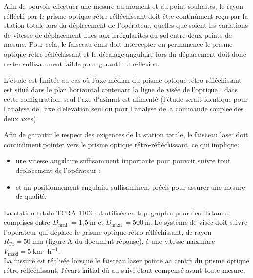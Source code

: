 Afin de pouvoir effectuer une mesure au moment et au point souhaités, le rayon réfléchi par le prisme optique rétro-réfléchissant doit être continûment reçu par la station totale lors du déplacement de l'opérateur, quelles que soient les variations de vitesse de déplacement dues aux irrégularités du sol entre deux points de mesure. Pour cela, le faisceau émis doit intercepter en permanence le prisme optique rétro-réfléchissant et le décalage angulaire lors du déplacement doit donc rester suffisamment faible pour garantir la réflexion.

L'étude est limitée au cas où l'axe médian du prisme optique rétro-réfléchissant est situé dans le plan horizontal contenant la ligne de visée de l'optique : dans cette configuration, seul l'axe d'azimut est alimenté (l'étude serait identique pour l'analyse de l'axe d'élévation seul ou pour l'analyse de la commande couplée des deux axes).

Afin de garantir le respect des exigences de la station totale, le faisceau laser doit continûment pointer vers le prisme optique rétro-réfléchissant, ce qui implique:

\begin{itemize}
  \item une vitesse angulaire suffisamment importante pour pouvoir suivre tout déplacement de l'opérateur ;
  \item et un positionnement angulaire suffisamment précis pour assurer une mesure de qualité.
\end{itemize}

La station totale TCRA 1103 est utilisée en topographie pour des distances comprises entre $D_{\text {mini }}=1,5 \mathrm{~m}$ et $D_{\text {maxi }}=500 \mathrm{~m}$. Le système de visée doit suivre l'opérateur qui déplace le prisme optique rétro-réfléchissant, de rayon $R_{\mathrm{Pr}}=50 \mathrm{~mm}$ (figure A du document réponse), à une vitesse maximale $V_{\mathrm{maxi}}=5 \mathrm{~km} \cdot \mathrm{~h}^{-1}$.\\
La mesure est réalisée lorsque le faisceau laser pointe au centre du prisme optique rétro-réfléchissant, l'écart initial dû au suivi étant compensé avant toute mesure.\\

